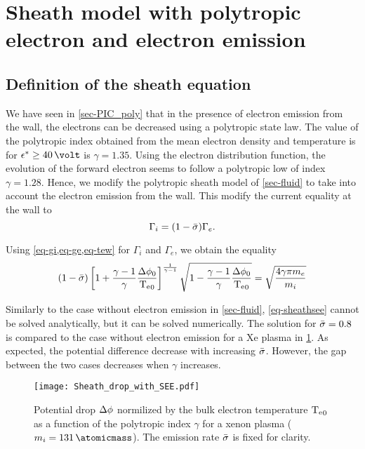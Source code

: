 
\section{Sheath model with polytropic electron and electron emission}
\label{sec-fluid_poly_see}

\subsection{Definition of the sheath equation} \label{subsec-def_sheat_see}

We have seen in \cref{sec-PIC_poly} that in the presence of electron emission from the wall, the electrons can be decreased using a polytropic state law.
The value of the polytropic index obtained from the mean electron density and temperature is for $\crover \geq 40 \,\volt$ is $\gamma = 1.35$.
Using the electron distribution function, the evolution of the forward electron seems to follow a polytropic low of index $\gamma=1.28$.
Hence, we modify the polytropic sheath model of \cref{sec-fluid} to take into account the electron emission from the wall.
This modify the current equality at the wall to
\begin{equation} \label{eq-see-J_eq}
  \Gamma_i = (1 -  \bar{\sigma }) \Gamma_e.
\end{equation}

Using \cref{eq-gi,eq-ge,eq-tew} for $\Gamma_i$ and $\Gamma_e$, we obtain the equality
\begin{equation}\label{eq-sheathsee}
  (1 -  \bar{\sigma } )\left[ 1 +\frac{\gamma -1}{\gamma} \frac{ \Delta \phi_0}{ \mathrm{T_e}_0}  \right]^{\frac{1}{\gamma - 1}} \sqrt{1 - \frac{\gamma -1}{\gamma}\frac{\Delta \phi_0}{\mathrm{T_e}_0}} = \sqrt{\frac{4 \gamma \pi m_e}{m_i}}
\end{equation}

Similarly to the case without electron emission in \cref{sec-fluid}, \cref{eq-sheathsee} cannot be solved analytically, but it can be solved numerically.
The solution for $ \bar{\sigma }=0.8$ is compared to the case without electron emission for a \ac{Xe} plasma in \cref{fig-dphi_see}.
As expected, the potential difference decrease with increasing $ \bar{\sigma }$.
However, the gap between the two cases decreases when $\gamma$ increases.

\begin{figure}[hbtp]
  \centering
  \texttt{[image: Sheath\_drop\_with\_SEE.pdf]}
  \caption{Potential drop $\Delta \phi$ normilized by the bulk electron temperature $\mathrm{T_e}_0$ as a function of the polytropic index $\gamma$ for a xenon plasma ($m_i = 131\,\atomicmass$). The emission rate $ \bar{\sigma }$ is fixed for clarity.}
  \label{fig-dphi_see}
\end{figure}

